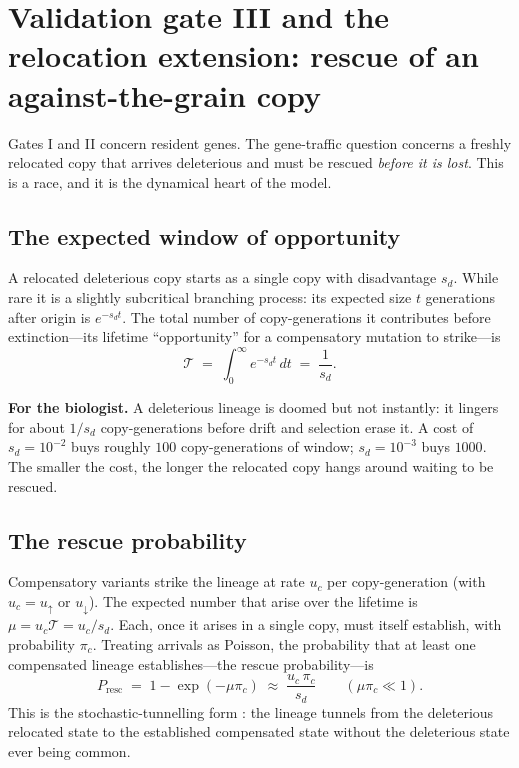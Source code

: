 \documentclass[11pt,a4paper]{article}
\newcommand{\Presc}{P_{\mathrm{resc}}}
\begin{document}
\section{Validation gate III and the relocation extension: rescue of an against-the-grain copy}

Gates I and II concern resident genes. The gene-traffic question concerns a freshly relocated copy that arrives deleterious and must be rescued \emph{before it is lost}. This is a race, and it is the dynamical heart of the model.

\subsection{The expected window of opportunity}

A relocated deleterious copy starts as a single copy with disadvantage $s_d$. While rare it is a slightly subcritical branching process: its expected size $t$ generations after origin is $e^{-s_d t}$. The total number of copy-generations it contributes before extinction---its lifetime ``opportunity'' for a compensatory mutation to strike---is
\begin{equation}
\mathcal{T} \;=\; \int_0^{\infty} e^{-s_d t}\,dt \;=\; \frac{1}{s_d}.
\label{eq:opportunity}
\end{equation}

\begin{checkpoint}
\textbf{For the biologist.} A deleterious lineage is doomed but not instantly: it lingers for about $1/s_d$ copy-generations before drift and selection erase it. A cost of $s_d=10^{-2}$ buys roughly $100$ copy-generations of window; $s_d=10^{-3}$ buys $1000$. The smaller the cost, the longer the relocated copy hangs around waiting to be rescued.
\end{checkpoint}

\subsection{The rescue probability}

Compensatory variants strike the lineage at rate $u_c$ per copy-generation (with $u_c=u_{\uparrow}$ or $u_{\downarrow}$). The expected number that arise over the lifetime is $\mu = u_c\mathcal{T}=u_c/s_d$. Each, once it arises in a single copy, must itself establish, with probability $\pi_c$. Treating arrivals as Poisson, the probability that at least one compensated lineage establishes---the rescue probability---is
\begin{equation}
\Presc \;=\; 1-\exp(-\mu\pi_c) \;\approx\; \frac{u_c\,\pi_c}{s_d} \qquad (\mu\pi_c\ll 1).
\label{eq:rescue}
\end{equation}
This is the stochastic-tunnelling form \citep{iwasa2004,orr2008}: the lineage tunnels from the deleterious relocated state to the established compensated state without the deleterious state ever being common.
\end{document}
